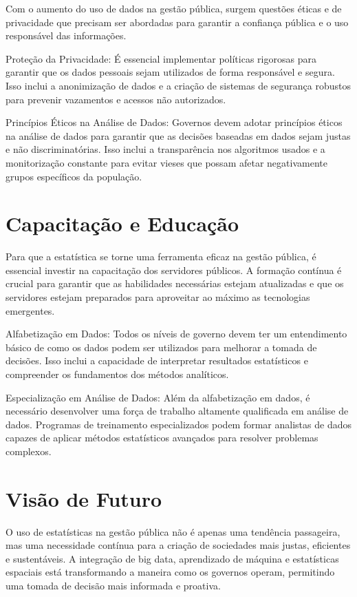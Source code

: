 Com o aumento do uso de dados na gestão pública, surgem questões éticas e de privacidade que precisam ser abordadas para garantir a confiança pública e o uso responsável das informações.\vskip0.3cm

Proteção da Privacidade: É essencial implementar políticas rigorosas para garantir que os dados pessoais sejam utilizados de forma responsável e segura. Isso inclui a anonimização de dados e a criação de sistemas de segurança robustos para prevenir vazamentos e acessos não autorizados.\vskip0.3cm

Princípios Éticos na Análise de Dados: Governos devem adotar princípios éticos na análise de dados para garantir que as decisões baseadas em dados sejam justas e não discriminatórias. Isso inclui a transparência nos algoritmos usados e a monitorização constante para evitar vieses que possam afetar negativamente grupos específicos da população.

\section{Capacitação e Educação}

Para que a estatística se torne uma ferramenta eficaz na gestão pública, é essencial investir na capacitação dos servidores públicos. A formação contínua é crucial para garantir que as habilidades necessárias estejam atualizadas e que os servidores estejam preparados para aproveitar ao máximo as tecnologias emergentes.\vskip0.3cm

Alfabetização em Dados: Todos os níveis de governo devem ter um entendimento básico de como os dados podem ser utilizados para melhorar a tomada de decisões. Isso inclui a capacidade de interpretar resultados estatísticos e compreender os fundamentos dos métodos analíticos.\vskip0.3cm

Especialização em Análise de Dados: Além da alfabetização em dados, é necessário desenvolver uma força de trabalho altamente qualificada em análise de dados. Programas de treinamento especializados podem formar analistas de dados capazes de aplicar métodos estatísticos avançados para resolver problemas complexos.


\newpage
\section{Visão de Futuro}

O uso de estatísticas na gestão pública não é apenas uma tendência passageira, mas uma necessidade contínua para a criação de sociedades mais justas, eficientes e sustentáveis. A integração de big data, aprendizado de máquina e estatísticas espaciais está transformando a maneira como os governos operam, permitindo uma tomada de decisão mais informada e proativa.\vskip0.3cm

